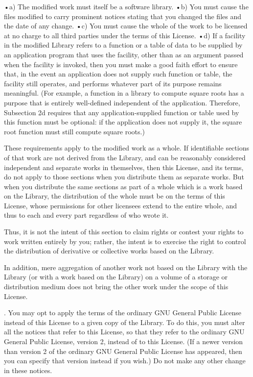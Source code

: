 •a) The modified work must itself be a software library. 
•b) You must cause the files modified to carry prominent notices stating that you changed the files and the date of any change. 
•c) You must cause the whole of the work to be licensed at no charge to all third parties under the terms of this License. 
•d) If a facility in the modified Library refers to a function or a table of data to be supplied by an application program that uses the facility, other than as an argument passed when the facility is invoked, then you must make a good faith effort to ensure that, in the event an application does not supply such function or table, the facility still operates, and performs whatever part of its purpose remains meaningful. 
(For example, a function in a library to compute square roots has a purpose that is entirely well-defined independent of the application. Therefore, Subsection 2d requires that any application-supplied function or table used by this function must be optional: if the application does not supply it, the square root function must still compute square roots.)

These requirements apply to the modified work as a whole. If identifiable sections of that work are not derived from the Library, and can be reasonably considered independent and separate works in themselves, then this License, and its terms, do not apply to those sections when you distribute them as separate works. But when you distribute the same sections as part of a whole which is a work based on the Library, the distribution of the whole must be on the terms of this License, whose permissions for other licensees extend to the entire whole, and thus to each and every part regardless of who wrote it. 

Thus, it is not the intent of this section to claim rights or contest your rights to work written entirely by you; rather, the intent is to exercise the right to control the distribution of derivative or collective works based on the Library. 

In addition, mere aggregation of another work not based on the Library with the Library (or with a work based on the Library) on a volume of a storage or distribution medium does not bring the other work under the scope of this License. 

. You may opt to apply the terms of the ordinary GNU General Public License instead of this License to a given copy of the Library. To do this, you must alter all the notices that refer to this License, so that they refer to the ordinary GNU General Public License, version 2, instead of to this License. (If a newer version than version 2 of the ordinary GNU General Public License has appeared, then you can specify that version instead if you wish.) Do not make any other change in these notices. 

